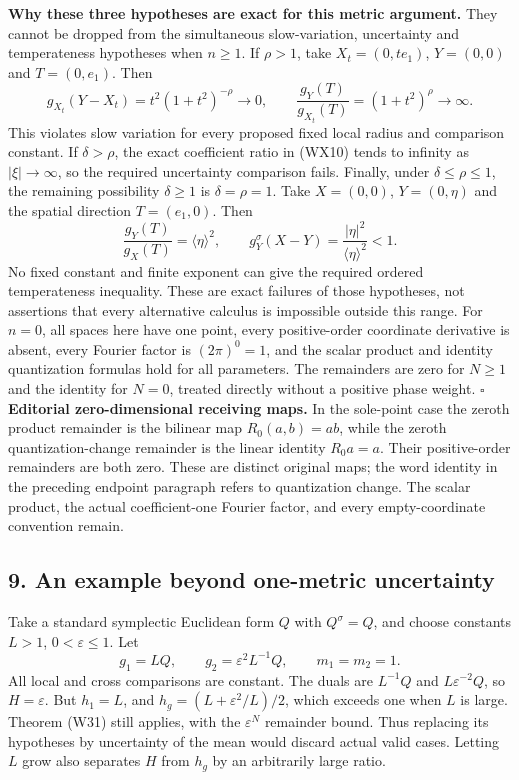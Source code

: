 \documentclass[
  11pt,
]{article}
\begin{document}
\textbf{Why these three hypotheses are exact for this metric argument.}
They cannot be dropped from the simultaneous slow-variation, uncertainty
and temperateness hypotheses when \(n\geq1\). If \(\rho>1\), take
\(X_t=(0,te_1)\), \(Y=(0,0)\) and \(T=(0,e_1)\). Then \[
 g_{X_t}(Y-X_t)=t^2(1+t^2)^{-\rho}\longrightarrow0,\qquad
 \frac{g_Y(T)}{g_{X_t}(T)}=(1+t^2)^\rho\longrightarrow\infty.
 \tag{WX13}
\] This violates slow variation for every proposed fixed local radius
and comparison constant. If \(\delta>\rho\), the exact coefficient ratio
in (WX10) tends to infinity as \(|\xi|\to\infty\), so the required
uncertainty comparison fails. Finally, under \(\delta\leq\rho\leq1\),
the remaining possibility \(\delta\geq1\) is \(\delta=\rho=1\). Take
\(X=(0,0)\), \(Y=(0,\eta)\) and the spatial direction \(T=(e_1,0)\).
Then \[
 \frac{g_Y(T)}{g_X(T)}=\langle\eta\rangle^2,\qquad
 g_Y^\sigma(X-Y)=\frac{|\eta|^2}{\langle\eta\rangle^2}<1.
 \tag{WX14}
\] No fixed constant and finite exponent can give the required ordered
temperateness inequality. These are exact failures of those hypotheses,
not assertions that every alternative calculus is impossible outside
this range. For \(n=0\), all spaces here have one point, every
positive-order coordinate derivative is absent, every Fourier factor is
\((2\pi)^0=1\), and the scalar product and identity quantization
formulas hold for all parameters. The remainders are zero for \(N\geq1\)
and the identity for \(N=0\), treated directly without a positive phase
weight. \(\square\) \textbf{Editorial zero-dimensional receiving maps.} In the
sole-point case the zeroth product remainder is the bilinear map
\(R_0(a,b)=ab\), while the zeroth quantization-change remainder is the
linear identity \(R_0a=a\). Their positive-order remainders are both
zero. These are distinct original maps; the word identity in the
preceding endpoint paragraph refers to quantization change. The scalar
product, the actual coefficient-one Fourier factor, and every
empty-coordinate convention remain.

\subsection{9. An example beyond one-metric
uncertainty}\label{an-example-beyond-one-metric-uncertainty}

Take a standard symplectic Euclidean form \(Q\) with \(Q^\sigma=Q\), and
choose constants \(L>1\), \(0<\varepsilon\leq1\). Let \[
g_1=LQ,\qquad g_2=\varepsilon^2L^{-1}Q,\qquad m_1=m_2=1.
\tag{W42}
\] All local and cross comparisons are constant. The duals are
\(L^{-1}Q\) and \(L\varepsilon^{-2}Q\), so \(H=\varepsilon\). But
\(h_1=L\), and \(h_g=(L+\varepsilon^2/L)/2\), which exceeds one when
\(L\) is large. Theorem (W31) still applies, with the \(\varepsilon^N\)
remainder bound. Thus replacing its hypotheses by uncertainty of the
mean would discard actual valid cases. Letting \(L\) grow also separates
\(H\) from \(h_g\) by an arbitrarily large ratio.
\end{document}
